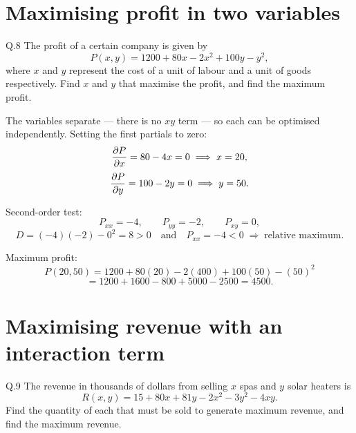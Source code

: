 \section{Maximising profit in two variables}

\begin{question}{Q.8}
The profit of a certain company is given by
\[
P(x,y)=1200+80x-2x^{2}+100y-y^{2},
\]
where $x$ and $y$ represent the cost of a unit of labour and a unit of goods
respectively. Find $x$ and $y$ that maximise the profit, and find the maximum
profit.
\end{question}

\begin{solution}
The variables separate --- there is no $xy$ term --- so each can be optimised
independently. Setting the first partials to zero:
\[
\frac{\partial P}{\partial x}=80-4x=0 \;\Longrightarrow\; x=20,
\]
\[
\frac{\partial P}{\partial y}=100-2y=0 \;\Longrightarrow\; y=50 .
\]

Second-order test:
\[
P_{xx}=-4,\qquad P_{yy}=-2,\qquad P_{xy}=0,
\]
\[
D=(-4)(-2)-0^{2}=8>0 \quad\text{and}\quad P_{xx}=-4<0
\;\Longrightarrow\; \text{relative maximum}.
\]

Maximum profit:
\[
P(20,50)=1200+80(20)-2(400)+100(50)-(50)^{2}
\]
\[
=1200+1600-800+5000-2500=4500 .
\]


\end{solution}

\section{Maximising revenue with an interaction term}

\begin{question}{Q.9}
The revenue in thousands of dollars from selling $x$ spas and $y$ solar heaters
is
\[
R(x,y)=15+80x+81y-2x^{2}-3y^{2}-4xy .
\]
Find the quantity of each that must be sold to generate maximum revenue, and
find the maximum revenue.
\end{question}

